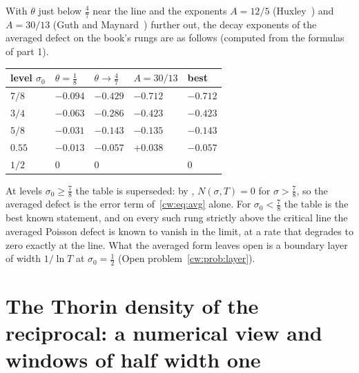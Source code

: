 With $\theta$ just below $\frac47$ near the line and the exponents $A=12/5$ (Huxley~\cite{Huxley72}) and $A=30/13$ (Guth and Maynard~\cite{GM26}) further out, the decay exponents of the averaged defect on the book's rungs are as follows (computed from the formulas of part 1).
\begin{center}
\small
\begin{tabular}{lllll}
\toprule
level $\sigma_0$ & $\theta=\frac18$ & $\theta\to\frac47$ & $A=30/13$ & best\\
\midrule
$7/8$ & $-0.094$ & $-0.429$ & $-0.712$ & $-0.712$\\
$3/4$ & $-0.063$ & $-0.286$ & $-0.423$ & $-0.423$\\
$5/8$ & $-0.031$ & $-0.143$ & $-0.135$ & $-0.143$\\
$0.55$ & $-0.013$ & $-0.057$ & $+0.038$ & $-0.057$\\
$1/2$ & $0$ & $0$ & & $0$\\
\bottomrule
\end{tabular}
\end{center}
At levels $\sigma_0\ge\frac78$ the table is superseded: by \cite{OAI26a}, $N(\sigma,T)=0$ for $\sigma>\frac78$, so the averaged defect is the error term of~\eqref{cw:eq:avg} alone. For $\sigma_0<\frac78$ the table is the best known statement, and on every such rung strictly above the critical line the averaged Poisson defect is known to vanish in the limit, at a rate that degrades to zero exactly at the line. What the averaged form leaves open is a boundary layer of width $1/\ln T$ at $\sigma_0=\frac12$ (Open problem~\ref{cw:prob:layer}).

\section{The Thorin density of the reciprocal: a numerical view and windows of half width one}\label{cw:sec:thorin}

